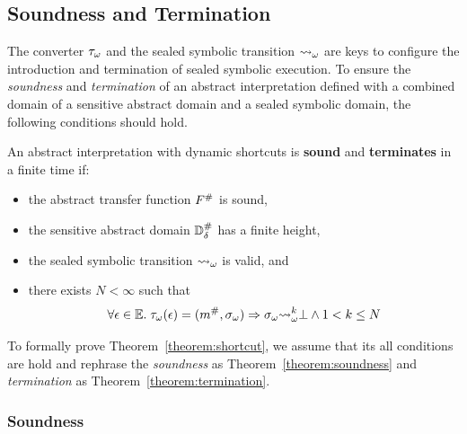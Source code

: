 \subsection{Soundness and Termination}
The converter ${\tau}_\omega$ and the sealed symbolic transition ${\leadsto}_\omega$ are
keys to configure the introduction and termination of sealed symbolic
execution.  To ensure the \textit{soundness} and \textit{termination} of an
abstract interpretation defined with a combined domain of a sensitive abstract
domain and a sealed symbolic domain, the following conditions should hold.

\begin{theorem}\label{theorem:shortcut}
An abstract interpretation with dynamic shortcuts is \textbf{sound} and
\textbf{terminates} in a finite time if:
  \begin{itemize}
    \item the abstract transfer function ${F}^{\#}$ is sound,
    \item the sensitive abstract domain ${\mathbb{D}}^{\#}_\delta$ has a finite height,
    \item the sealed symbolic transition ${\leadsto}_\omega$ is valid, and
    \item there exists $N < \infty$ such that
      \[
        \forall \epsilon \in \mathbb{E}. \; {\tau}_\omega(\epsilon) = ({m}^{\#},
        {\sigma}_\omega) \Rightarrow {\sigma}_\omega
        {\leadsto}_\omega^k \bot \wedge 1 < k \leq N
      \]
  \end{itemize}
\end{theorem}

To formally prove Theorem~\ref{theorem:shortcut}, we assume that its all
conditions are hold and rephrase the \textit{soundness} as
Theorem~\ref{theorem:soundness} and \textit{termination} as
Theorem~\ref{theorem:termination}.

\subsubsection{Soundness}


